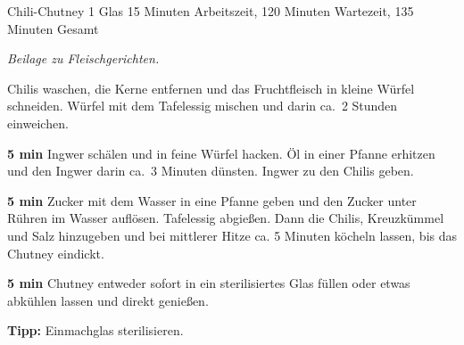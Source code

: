 \begin{recipe}{Chili-Chutney} {1 Glas} {15 Minuten Arbeitszeit, 120 Minuten Wartezeit, 135 Minuten Gesamt}

  \freeform{}\textit{Beilage zu Fleischgerichten.}


  Chilis waschen, die Kerne entfernen und das Fruchtfleisch in kleine Würfel schneiden.
  Würfel mit dem Tafelessig mischen und darin ca.\ 2 Stunden einweichen.

  \newstep{}\textbf{5 min}
  Ingwer schälen und in feine Würfel hacken.
  Öl in einer Pfanne erhitzen und den Ingwer darin ca.\ 3 Minuten dünsten.
  Ingwer zu den Chilis geben.

  \newstep{}\textbf{5 min}
  Zucker mit dem Wasser in eine Pfanne geben und den Zucker unter Rühren im Wasser auflösen.
  Tafelessig abgießen.
  Dann die Chilis, Kreuzkümmel und Salz hinzugeben und bei mittlerer Hitze ca. 5 Minuten köcheln lassen, bis das Chutney eindickt.

  \newstep{}\textbf{5 min}
  Chutney entweder sofort in ein sterilisiertes Glas füllen oder etwas abkühlen lassen und direkt genießen.

  \freeform{}\hrulefill{}

  \freeform{}\textbf{Tipp:}
  Einmachglas sterilisieren.

\end{recipe}
